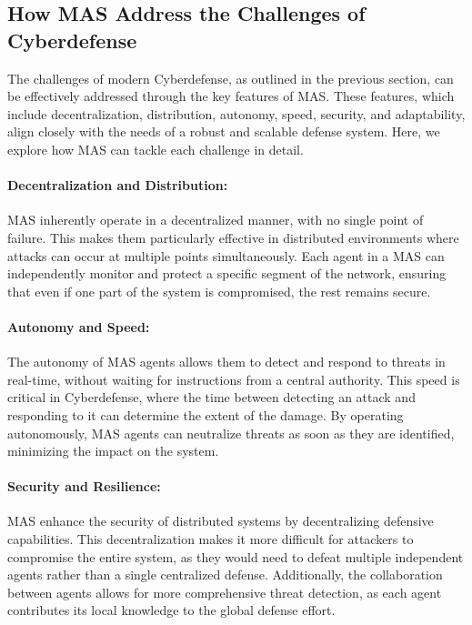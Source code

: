 \subsection{How MAS Address the Challenges of Cyberdefense}

The challenges of modern Cyberdefense, as outlined in the previous section, can be effectively addressed through the key features of MAS. These features, which include decentralization, distribution, autonomy, speed, security, and adaptability, align closely with the needs of a robust and scalable defense system. Here, we explore how MAS can tackle each challenge in detail.

\paragraph{Decentralization and Distribution:}
MAS inherently operate in a decentralized manner, with no single point of failure. This makes them particularly effective in distributed environments where attacks can occur at multiple points simultaneously. Each agent in a MAS can independently monitor and protect a specific segment of the network, ensuring that even if one part of the system is compromised, the rest remains secure.

\paragraph{Autonomy and Speed:}
The autonomy of MAS agents allows them to detect and respond to threats in real-time, without waiting for instructions from a central authority. This speed is critical in Cyberdefense, where the time between detecting an attack and responding to it can determine the extent of the damage. By operating autonomously, MAS agents can neutralize threats as soon as they are identified, minimizing the impact on the system.

\paragraph{Security and Resilience:}
MAS enhance the security of distributed systems by decentralizing defensive capabilities. This decentralization makes it more difficult for attackers to compromise the entire system, as they would need to defeat multiple independent agents rather than a single centralized defense. Additionally, the collaboration between agents allows for more comprehensive threat detection, as each agent contributes its local knowledge to the global defense effort.

